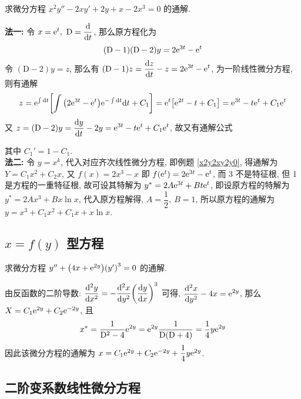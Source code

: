\begin{example}
    求微分方程 $x^2y''-2xy'+2y+x-2x^3=0$ 的通解.
\end{example}
\begin{solution}
    \textbf{法一: }令 $x=\mathrm{e} ^t,~\mathrm{D}=\displaystyle\dv{t}$, 那么原方程化为
    $$(\mathrm{D}-1)(\mathrm{D}-2)y=2\mathrm{e} ^{3t}-\mathrm{e} ^t$$
    令 $(\mathrm{D}-2)y=z$, 那么有 $(\mathrm{D}-1)z=\displaystyle\dv{z}{t}-z=2\mathrm{e} ^{3t}-\mathrm{e} ^t$, 为一阶线性微分方程, 则有通解
    $$z=\mathrm{e} ^{\int\dd t}\qty[\int\qty(2\mathrm{e} ^{3t}-\mathrm{e} ^t)\mathrm{e} ^{-\int\dd t}\dd t+C_1]=\mathrm{e} ^t\qty[\mathrm{e} ^{2t}-t+C_1]=\mathrm{e} ^{3t}-t\mathrm{e} ^{t}+C_1\mathrm{e} ^t$$
    又 $z=(\mathrm{D}-2)y=\displaystyle\dv{y}{t}-2y=\mathrm{e} ^{3t}-t\mathrm{e} ^{t}+C_1\mathrm{e} ^t$, 故又有通解公式
    其中 $C_1'=1-C_1.$\\
    \textbf{法二: }令 $y=x^k$, 代入对应齐次线性微分方程, 即例题 \ref{x2y2xy2y0}, 得通解为 $Y=C_1x^2+C_2x$,
    又 $f(x)=2x^3-x$ 即 $f\qty(\mathrm{e} ^t)=2\mathrm{e} ^{3t}-\mathrm{e} ^t$, 而 3 不是特征根, 但 1 是方程的一重特征根,
    故可设其特解为 $y^*=2A\mathrm{e} ^{3t}+Bt\mathrm{e} ^t$,
    即设原方程的特解为 $y^*=2Ax^3+Bx\ln x$, 代入原方程解得, $A=\dfrac{1}{2},~B=1$, 所以原方程的通解为
    $y=x^3+C_1x^2+C_1x+x\ln x.$
\end{solution}

\subsection{$x=f(y)$ 型方程}

\begin{example}
    求微分方程 $y''+\qty(4x+\mathrm{e} ^{2y})\qty(y')^3=0$ 的通解.
\end{example}
\begin{solution}
由反函数的二阶导数: $\displaystyle \dv[2]{y}{x}=-\dv[2]{x}{y}\qty(\dv{y}{x})^3$ 可得, $\displaystyle \dv[2]{x}{y}-4x=\mathrm{e} ^{2y}$, 那么 $X=C_1\mathrm{e} ^{2y}+C_2\mathrm{e} ^{-2y}$, 且 $$
x^*=\dfrac{1}{\mathrm{D}^2-4}\mathrm{e} ^{2y}=\mathrm{e} ^{2y}\dfrac{1}{\mathrm{D}\qty(\mathrm{D}+4)}=\dfrac{1}{4}y\mathrm{e} ^{2y}
$$ 因此该微分方程的通解为 $x=C_1\mathrm{e} ^{2y}+C_2\mathrm{e} ^{-2y}+\dfrac{1}{4}y\mathrm{e} ^{2y}$.
\end{solution}

\subsection{二阶变系数线性微分方程}

